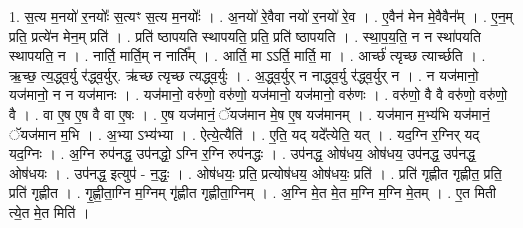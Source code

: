 \documentclass[17pt]{extarticle}
\begin{document}
1. स॒त्य म॒नयो॑ र॒नयोः᳚ स॒त्यꣳ स॒त्य म॒नयोः᳚ । . अ॒नयो॑ रे॒वैवा नयो॑ र॒नयो॑ रे॒व । . ए॒वैन॑ मेन मे॒वैवैन᳚म् । . ए॒न॒म् प्रति॒ प्रत्ये॑न मेन॒म् प्रति॑ । . प्रति॑ ष्ठापयति स्थापयति॒ प्रति॒ प्रति॑ ष्ठापयति । . स्था॒प॒य॒ति॒ न न स्था॑पयति स्थापयति॒ न । . नार्ति॒ मार्ति॒म् न नार्ति᳚म् । . आर्ति॒ मा ऽऽर्ति॒ मार्ति॒ मा । . आर्च्छ॑ त्यृच्छ त्यार्च्छति । . ऋ॒च्छ॒ त्य॒द्ध्व॒र्यु र॑द्ध्व॒र्युर्. ऋ॑च्छ त्यृच्छ त्यद्ध्व॒र्युः । . अ॒द्ध्व॒र्युर् न नाद्ध्व॒र्यु र॑द्ध्व॒र्युर् न । . न यज॑मानो॒ यज॑मानो॒ न न यज॑मानः । . यज॑मानो॒ वरु॑णो॒ वरु॑णो॒ यज॑मानो॒ यज॑मानो॒ वरु॑णः । . वरु॑णो॒ वै वै वरु॑णो॒ वरु॑णो॒ वै । . वा ए॒ष ए॒ष वै वा ए॒षः । . ए॒ष यज॑मानं॒ ॅयज॑मान मे॒ष ए॒ष यज॑मानम् । . यज॑मान म॒भ्य॑भि यज॑मानं॒ ॅयज॑मान म॒भि । . अ॒भ्या ऽभ्य॑भ्या । . ऐत्ये॒त्यैति॑ । . ए॒ति॒ यद् यदे᳚त्येति॒ यत् । . यद॒ग्नि र॒ग्निर् यद् यद॒ग्निः । . अ॒ग्नि रुप॑नद्ध॒ उप॑नद्धो॒ ऽग्नि र॒ग्नि रुप॑नद्धः । . उप॑नद्ध॒ ओष॑धय॒ ओष॑धय॒ उप॑नद्ध॒ उप॑नद्ध॒ ओष॑धयः । . उप॑नद्ध॒ इत्युप॑ - न॒द्धः॒ । . ओष॑धयः॒ प्रति॒ प्रत्योष॑धय॒ ओष॑धयः॒ प्रति॑ । . प्रति॑ गृह्णीत गृह्णीत॒ प्रति॒ प्रति॑ गृह्णीत । . गृ॒ह्णी॒ता॒ग्नि म॒ग्निम् गृ॑ह्णीत गृह्णीता॒ग्निम् । . अ॒ग्नि मे॒त मे॒त म॒ग्नि म॒ग्नि मे॒तम् । . ए॒त मिती त्ये॒त मे॒त मिति॑ । \newline
\end{document}
